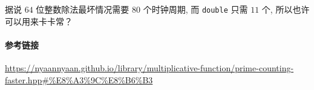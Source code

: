 据说 \(64\) 位整数除法最坏情况需要 \(80\) 个时钟周期, 而 \verb|double| 只需 \(11\) 个, 所以也许可以用来卡卡常？

\paragraph{参考链接}

\url{https://nyaannyaan.github.io/library/multiplicative-function/prime-counting-faster.hpp#%E8%A3%9C%E8%B6%B3}
